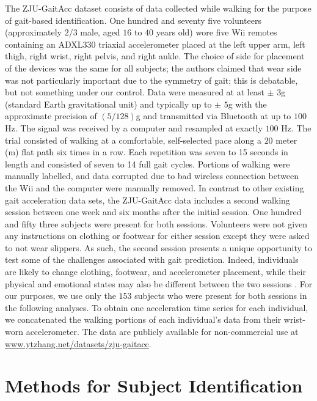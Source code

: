 The ZJU-GaitAcc dataset consists of data collected while walking for the purpose of gait-based identification. One hundred and seventy five volunteers (approximately $2/3$ male, aged $16$ to $40$ years old) wore five Wii remotes containing an ADXL330 triaxial accelerometer placed at the left upper arm, left thigh, right wrist, right pelvis, and right ankle. The choice of side for placement of the devices was the same for all subjects; the authors claimed that wear side was not particularly important due to the symmetry of gait; this is debatable, but not something under our control. Data were  measured at at least $\pm$ $3$g (standard Earth gravitational unit) and typically up to $\pm$ $5$g with the approximate precision of $(5/128)$g and transmitted via Bluetooth at up to $100$ Hz. The signal was received by a computer and resampled at exactly $100$ Hz. The trial consisted of walking at a comfortable, self-selected pace along a $20$ meter (m) flat path six times in a row. Each repetition was seven to 15 seconds in length and consisted of seven to 14 full gait cycles. Portions of walking were manually labelled, and data corrupted due to bad wireless connection between the Wii and the computer were manually removed. In contrast to other existing gait acceleration data sets, the ZJU-GaitAcc data includes a second walking session between one week and six months after the initial session. One hundred and fifty three subjects were present for both sessions. Volunteers were not given any instructions on clothing or footwear for either session except they were asked to not wear slippers. As such, the second session presents a unique opportunity to test some of the challenges associated with gait prediction. Indeed, individuals are likely to change clothing, footwear, and accelerometer placement, while their physical and emotional states may also be different between the two sessions \cite{zhang_accelerometer-based_2015}. For our purposes, we use only the $153$ subjects who were present for both sessions in the following analyses. To obtain one acceleration time series for each individual, we concatenated the walking portions of each individual's data from their wrist-worn accelerometer. The data are publicly available for non-commercial use at \url{www.ytzhang.net/datasets/zju-gaitacc}. 

\section{Methods for Subject Identification}
\label{sec:meth}
